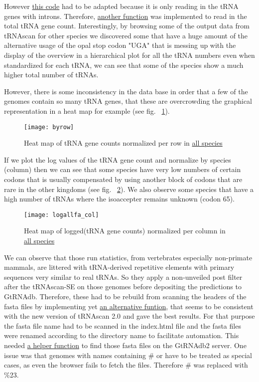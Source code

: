 However \hyperlink{function:readintronic}{this code} had to be adapted because it is only reading in the tRNA genes with introns. Therefore, \hyperlink{function:readstats}{another function} was implemented to read in the total tRNA gene count. Interestingly, by browsing some of the output data from tRNAscan for other species we discovered some that have a huge amount of the alternative usage of the opal stop codon "UGA" that is messing up with the display of the overview in a hierarchical plot for all the tRNA numbers even when standardized for each tRNA, we can see that some of the species show a much higher total number of tRNAs. 

However, there is some inconsistency in the data base in order that a few of the genomes contain so many tRNA genes, that these are overcrowding the graphical representation in a heat map for example (see fig. ~\ref{fig:byrow}).

\begin{figure}[tb] 
\centering 
\texttt{[image: byrow]} 
\caption[Heat map for tRNA counts]{Heat map of tRNA gene counts normalized per row in \hyperlink{data:veab}{all species}}
\label{fig:byrow} 
\end{figure}

If we plot the log values of the tRNA gene count and normalize by species (column) then we can see that some species have very low numbers of certain codons that is usually compensated by using another block of codons that are rare in the other kingdoms  (see fig. ~\ref{fig:bycol}). We also observe some species that have a high number of tRNAs where the isoaccepter remains unknown (codon 65). \\

\begin{figure}[tb] 
\centering 
\texttt{[image: logallfa\_col]} 
\caption[Heat map for log(tRNA counts)]{Heat map of logged(tRNA gene counts) normalized per column in \hyperlink{data:veab}{all species}}
\label{fig:bycol} 
\end{figure}

We can observe that those run statistics, from vertebrates especially non-primate mammals, are littered with tRNA-derived repetitive elements with primary sequences very similar to real tRNAs. So they apply a non-unveiled post filter after the tRNAscan-SE on those genomes before depositing the predictions to GtRNAdb. Therefore, these had to be rebuild from scanning the headers of the fasta files by implementing yet \hyperlink{function:readfasta}{an alternative funtion}, that seems to be consistent with the new version of tRNAscan 2.0 and gave the best results. For that purpose the fasta file name had to be scanned in the index.html file and the fasta files were renamed according to the directory name to facilitate automation. This needed \hyperlink{function:searchfafile}{a helper function} to find those fasta files on the GtRNAdb2 server. One issue was that genomes with names containing \# or \* have to be treated as special cases, as even the browser fails to fetch the files. Therefore \# was replaced with \%23. \\

